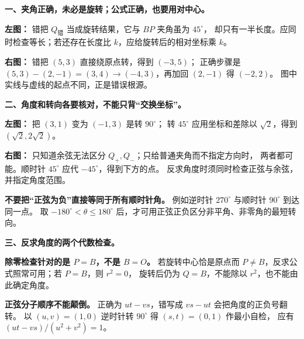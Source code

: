 \begin{trapbox}
\textbf{一、夹角正确，未必是旋转；公式正确，也要用对中心。}

\textbf{左图：} 错把 $Q_{\text{错}}$ 当成旋转结果，它与 $BP$ 夹角虽为 $45^\circ$，
却只有一半长度。应同时检查等长；若还存在长度比 $k$，应给旋转后的相对坐标乘 $k$。

\textbf{右图：} 错把 $(5,3)$ 直接绕原点转，得到 $(-3,5)$；
正确步骤是 $(5,3)-(2,-1)=(3,4)\to(-4,3)$，再加回 $(2,-1)$ 得 $(-2,2)$。
图中实线与虚线的起点不同，正是错误根源。
\end{trapbox}
\clearpage
\begin{trapbox}
\textbf{二、角度和转向各要核对，不能只背“交换坐标”。}

\textbf{左图：} 把 $(3,1)$ 变为 $(-1,3)$ 是转 $90^\circ$；
转 $45^\circ$ 应用坐标和差除以 $\sqrt2$，得到 $(\sqrt2,2\sqrt2)$。

\textbf{右图：} 只知道余弦无法区分 $Q_+,Q_-$；只给普通夹角而不指定方向时，
两者都可能。顺时针 $45^\circ$ 应代 $-45^\circ$，得到下方的点。
反求角度时须同时检查正弦与余弦，并指定角度范围。

\textbf{不要把“正弦为负”直接等同于所有顺时针角。}
例如逆时针 $270^\circ$ 与顺时针 $90^\circ$ 到达同一点。
取 $-180^\circ<\theta\le180^\circ$ 后，才可用正弦正负区分非平角、非零角的最短转向。
\end{trapbox}
\begin{trapbox}
\textbf{三、反求角度的两个代数检查。}

\textbf{除零检查针对的是 $P=B$，不是 $B=O$。}
若旋转中心恰是原点而 $P\ne B$，反求公式照常可用；若 $P=B$，则 $r^2=0$，
旋转后仍为 $Q=B$，不能除以 $r^2$，也不能由此确定角度。

\textbf{正弦分子顺序不能颠倒。}
正确为 $ut-vs$，错写成 $vs-ut$ 会把角度的正负号翻转。
以 $(u,v)=(1,0)$ 逆时针转 $90^\circ$ 得 $(s,t)=(0,1)$ 作最小自检，
应有 $(ut-vs)/(u^2+v^2)=1$。

\end{trapbox}
